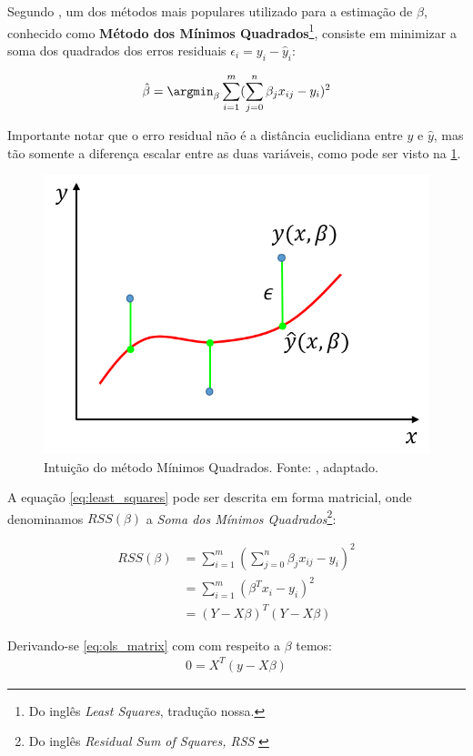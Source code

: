 Segundo \cite[p.12]{Hastie}, um dos métodos mais populares utilizado para a estimação de $ \beta $, conhecido como \textbf{Método dos Mínimos Quadrados}\footnote{Do inglês \textit{Least Squares}, tradução nossa.}, consiste em minimizar a soma dos quadrados dos erros residuais $ \epsilon_i = y_i - \hat{y}_i $: 

\begin{equation}\label{eq:least_squares}
\hat{\beta} = \argmin_\beta \sum_{i=1}^{m} (\sum_{j=0}^{n}\beta_j x_{ij} - y_{i})^2
\end{equation}



Importante notar que o erro residual não é a distância euclidiana entre $ y $ e $ \hat{y} $, mas tão somente a diferença escalar entre as duas variáveis, como pode ser visto na \cref{fig:bishop_least_square_intuition}.

\begin{figure}[h!]
\centering
\includegraphics[width=0.5\linewidth]{img/intuicao_epsilon}
\caption[Intuição do método Mínimos Quadrados.]{Intuição do método Mínimos Quadrados. Fonte: \cite[p.6]{Bishop}, adaptado.}

\label{fig:bishop_least_square_intuition}
\end{figure}

A equação \ref{eq:least_squares} pode ser descrita em forma matricial, onde denominamos $ RSS(\beta) $ a \textit{Soma dos Mínimos Quadrados}\footnote{Do inglês \textit{Residual Sum of Squares, RSS} \cite[p.12]{Hastie}}:

\begin{align}\label{eq:ols_matrix}
RSS(\beta) &= \sum_{i=1}^{m} (\sum_{j=0}^{n}\beta_j x_{ij} - y_{i})^2 \nonumber\\
&= \sum_{i=1}^{m} (\beta^Tx_i - y_i)^2 \nonumber\\
&= (Y-X\beta)^T(Y-X\beta)
\end{align}

Derivando-se \eqref{eq:ols_matrix} com com respeito a $ \beta $ temos:
\begin{align}
0=X^T(y-X\beta)
\end{align} 

